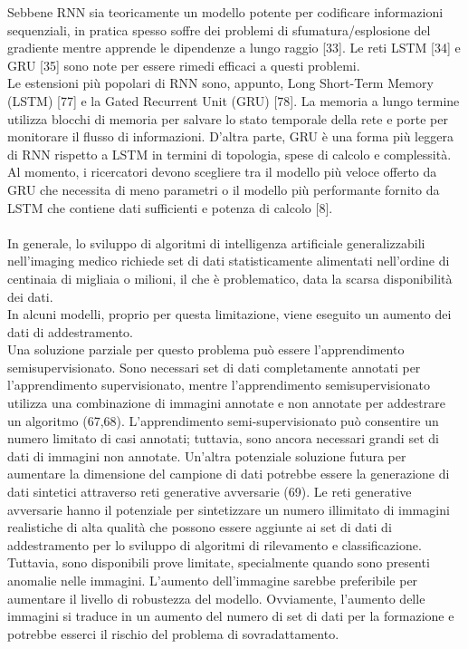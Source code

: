 \documentclass[12pt,a4paper]{report}
\begin{document}
Sebbene RNN sia teoricamente un modello potente per codificare informazioni sequenziali, in pratica spesso soffre dei problemi di sfumatura/esplosione del gradiente mentre apprende le dipendenze a lungo raggio [33]. Le reti LSTM [34] e GRU [35] sono note per essere rimedi efficaci a questi problemi.\\
Le estensioni più popolari di RNN sono, appunto, Long Short-Term Memory (LSTM) [77] e la Gated Recurrent Unit (GRU) [78]. La memoria a lungo termine utilizza blocchi di memoria per salvare lo stato temporale della rete e porte per monitorare il flusso di informazioni. D'altra parte, GRU è una forma più leggera di RNN rispetto a LSTM in termini di topologia, spese di calcolo e complessità. Al momento, i ricercatori devono scegliere tra il modello più veloce offerto da GRU che necessita di meno parametri o il modello più performante fornito da LSTM che contiene dati sufficienti e potenza di calcolo [8].\\
\\
In generale, lo sviluppo di algoritmi di intelligenza artificiale generalizzabili nell'imaging medico richiede set di dati statisticamente alimentati nell'ordine di centinaia di migliaia o milioni, il che è problematico, data la scarsa disponibilità
dei dati.\\
In alcuni modelli, proprio per questa limitazione, viene eseguito un aumento dei dati di addestramento.\\
Una soluzione parziale per questo problema può essere l'apprendimento semisupervisionato. Sono necessari
set di dati completamente annotati per l'apprendimento supervisionato, mentre l'apprendimento semisupervisionato
utilizza una combinazione di immagini annotate e non annotate per addestrare un algoritmo (67,68).
L'apprendimento semi-supervisionato può consentire un numero limitato di casi annotati; tuttavia, sono ancora 
necessari grandi set di dati di immagini non annotate.
Un'altra potenziale soluzione futura per aumentare la dimensione del campione di dati potrebbe essere la generazione di dati 
sintetici attraverso reti generative avversarie (69). Le reti generative avversarie hanno il potenziale per sintetizzare un numero
illimitato di immagini realistiche di alta qualità che possono essere aggiunte ai set di dati di addestramento per lo sviluppo di 
algoritmi di rilevamento e classificazione. Tuttavia, sono disponibili prove limitate, specialmente quando sono presenti anomalie nelle immagini.
L'aumento dell'immagine sarebbe preferibile per aumentare il livello di robustezza del modello. Ovviamente, l'aumento delle immagini si traduce in un aumento del numero di set di dati per la formazione e potrebbe esserci il rischio del problema di sovradattamento.\\
\end{document}
